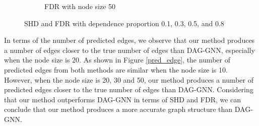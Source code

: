 \documentclass[10pt]{article}
\begin{document}
\begin{figure}
\begin{subfigure}{0.45\textwidth}
        \caption{FDR with node size 50}
        \label{FDR_node50}
    \end{subfigure}
    \caption{SHD and FDR with dependence proportion 0.1, 0.3, 0.5, and 0.8}
    \label{SHD_FDR}
\end{figure}

In terms of the number of predicted edges, we observe that our method produces a number of edges closer to the true number of edges than DAG-GNN, especially when the node size is 20. As shown in Figure \ref*{pred_edge}, the number of predicted edges from both methods are similar when the node size is 10. However, when the node size is 20, 30 and 50, our method produces a number of predicted edges closer to the true number of edges than DAG-GNN. Considering that our method outperforms DAG-GNN in terms of SHD and FDR, we can conclude that our method produces a more accurate graph structure than DAG-GNN.
\end{document}
